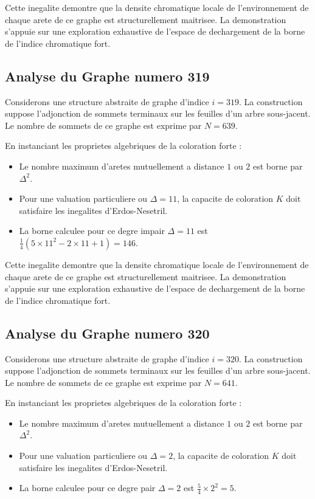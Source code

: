 \documentclass[11pt,a4paper]{article}
\begin{document}
Cette inegalite demontre que la densite chromatique locale de l'environnement de chaque arete de ce graphe est structurellement maitrisee. La demonstration s'appuie sur une exploration exhaustive de l'espace de dechargement de la borne de l'indice chromatique fort.

\subsection{Analyse du Graphe numero 319}
Considerons une structure abstraite de graphe d'indice $i = 319$. La construction suppose l'adjonction de sommets terminaux sur les feuilles d'un arbre sous-jacent. Le nombre de sommets de ce graphe est exprime par $N = 639$.

En instanciant les proprietes algebriques de la coloration forte :
\begin{itemize}
\item Le nombre maximum d'aretes mutuellement a distance $1$ ou $2$ est borne par $\Delta^2$.
\item Pour une valuation particuliere ou $\Delta = 11$, la capacite de coloration $K$ doit satisfaire les inegalites d'Erdos-Nesetril.
\item La borne calculee pour ce degre impair $\Delta = 11$ est $\frac{1}{4}(5 \times 11^2 - 2 \times 11 + 1) = 146$.
\end{itemize}

Cette inegalite demontre que la densite chromatique locale de l'environnement de chaque arete de ce graphe est structurellement maitrisee. La demonstration s'appuie sur une exploration exhaustive de l'espace de dechargement de la borne de l'indice chromatique fort.

\subsection{Analyse du Graphe numero 320}
Considerons une structure abstraite de graphe d'indice $i = 320$. La construction suppose l'adjonction de sommets terminaux sur les feuilles d'un arbre sous-jacent. Le nombre de sommets de ce graphe est exprime par $N = 641$.

En instanciant les proprietes algebriques de la coloration forte :
\begin{itemize}
\item Le nombre maximum d'aretes mutuellement a distance $1$ ou $2$ est borne par $\Delta^2$.
\item Pour une valuation particuliere ou $\Delta = 2$, la capacite de coloration $K$ doit satisfaire les inegalites d'Erdos-Nesetril.
\item La borne calculee pour ce degre pair $\Delta = 2$ est $\frac{5}{4} \times 2^2 = 5$.
\end{itemize}
\end{document}
